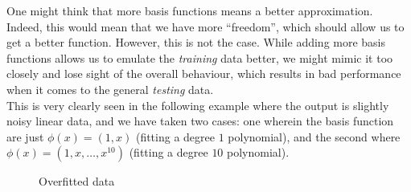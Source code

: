 \documentclass{article}
\begin{document}
			\begin{remark}[Overfitting]
				One might think that more basis functions means a better approximation. Indeed, this would mean that we have more ``freedom'', which should allow us to get a better function. However, this is not the case. While adding more basis functions allows us to emulate the \emph{training} data better, we might mimic it too closely and lose sight of the overall behaviour, which results in bad performance when it comes to the general \emph{testing} data.\\
				This is very clearly seen in the following example where the output is slightly noisy linear data, and we have taken two cases: one wherein the basis function are just $\phi(x) = (1,x)$ (fitting a degree $1$ polynomial), and the second where $\phi(x) = (1,x,\ldots,x^{10})$ (fitting a degree $10$ polynomial).

				\begin{figure}[H]
					\centering
					\caption{Overfitted data}
				\end{figure}

			\end{remark}



% 
% 
\end{document}
